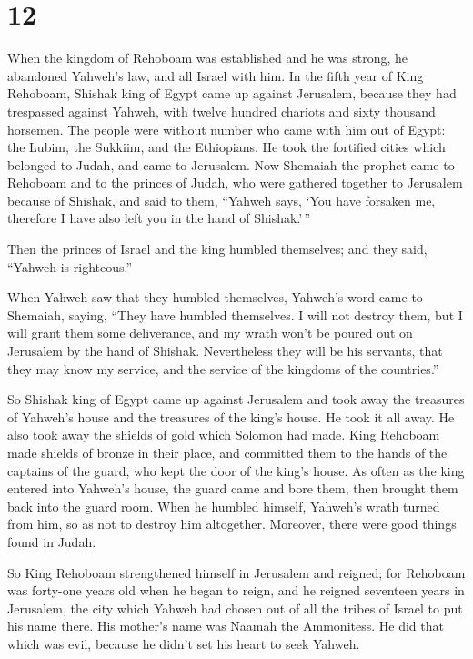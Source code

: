 \hypertarget{section-11}{%
\section{12}\label{section-11}}

 When the kingdom of Rehoboam was established and he was
strong, he abandoned Yahweh's law, and all Israel with him.
 In the fifth year of King Rehoboam, Shishak king of Egypt
came up against Jerusalem, because they had trespassed against Yahweh,
 with twelve hundred chariots and sixty thousand horsemen.
The people were without number who came with him out of Egypt: the
Lubim, the Sukkiim, and the Ethiopians.  He took the
fortified cities which belonged to Judah, and came to Jerusalem.
 Now Shemaiah the prophet came to Rehoboam and to the
princes of Judah, who were gathered together to Jerusalem because of
Shishak, and said to them, ``Yahweh says, `You have forsaken me,
therefore I have also left you in the hand of Shishak.'\,''

 Then the princes of Israel and the king humbled
themselves; and they said, ``Yahweh is righteous.''

 When Yahweh saw that they humbled themselves, Yahweh's
word came to Shemaiah, saying, ``They have humbled themselves. I will
not destroy them, but I will grant them some deliverance, and my wrath
won't be poured out on Jerusalem by the hand of Shishak. 
Nevertheless they will be his servants, that they may know my service,
and the service of the kingdoms of the countries.''

 So Shishak king of Egypt came up against Jerusalem and
took away the treasures of Yahweh's house and the treasures of the
king's house. He took it all away. He also took away the shields of gold
which Solomon had made.  King Rehoboam made shields of
bronze in their place, and committed them to the hands of the captains
of the guard, who kept the door of the king's house.  As
often as the king entered into Yahweh's house, the guard came and bore
them, then brought them back into the guard room.  When
he humbled himself, Yahweh's wrath turned from him, so as not to destroy
him altogether. Moreover, there were good things found in Judah.

 So King Rehoboam strengthened himself in Jerusalem and
reigned; for Rehoboam was forty-one years old when he began to reign,
and he reigned seventeen years in Jerusalem, the city which Yahweh had
chosen out of all the tribes of Israel to put his name there. His
mother's name was Naamah the Ammonitess.  He did that
which was evil, because he didn't set his heart to seek Yahweh.

